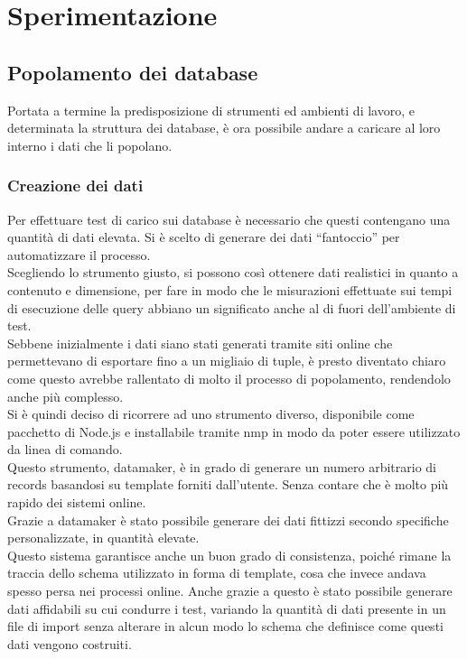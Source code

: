 
\chapter{Sperimentazione}
\label{cap:sperimentazione}
\section{Popolamento dei database}

Portata a termine la predisposizione di strumenti ed ambienti di lavoro, e determinata la struttura dei database, è ora possibile andare a caricare al loro interno i dati che li popolano.\\

\subsection{Creazione dei dati}
Per effettuare test di carico sui database è necessario che questi contengano una quantità di dati elevata. Si è scelto di generare dei dati ``fantoccio'' per automatizzare il processo.\\
Scegliendo lo strumento giusto, si possono così ottenere dati realistici in quanto a contenuto e dimensione, per fare in modo che le misurazioni effettuate sui tempi di esecuzione delle query abbiano un significato anche al di fuori dell'ambiente di test.\\
Sebbene inizialmente i dati siano stati generati tramite siti online che permettevano di esportare fino a un migliaio di tuple, è presto diventato chiaro come questo avrebbe rallentato di molto il processo di popolamento, rendendolo anche più complesso.\\

\noindent Si è quindi deciso di ricorrere ad uno strumento diverso, disponibile come pacchetto di Node.js e installabile tramite nmp in modo da poter essere utilizzato da linea di comando.\\
Questo strumento, datamaker, è in grado di generare un numero arbitrario di records basandosi su template forniti dall'utente. Senza contare che è molto più rapido dei sistemi online.\\
Grazie a datamaker è stato possibile generare dei dati fittizzi secondo specifiche personalizzate, in quantità elevate.\\
Questo sistema garantisce anche un buon grado di consistenza, poiché rimane la traccia dello schema utilizzato in forma di template, cosa che invece andava spesso persa nei processi online. Anche grazie a questo è stato possibile generare dati affidabili su cui condurre i test, variando la quantità di dati presente in un file di import senza alterare in alcun modo lo schema che definisce come questi dati vengono costruiti.\\


